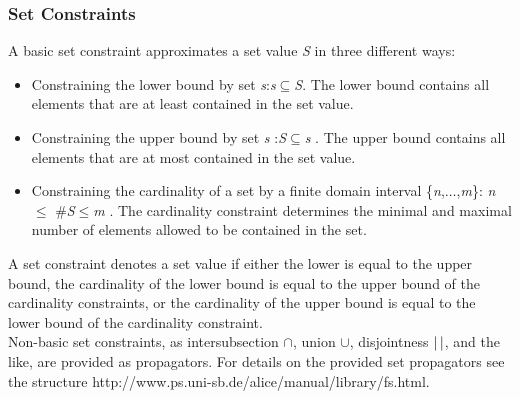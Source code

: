 \documentclass[a4paper]{scrartcl}
\begin{document}
\subsubsection{Set Constraints}
A basic set constraint approximates a set value {\it S} 
in three different ways: 
\begin{itemize}
\item
Constraining the lower bound by set {\it s}:{\it s}$\subseteq${\it S}. 
The lower bound contains all elements that are at 
least contained in the set value. 
\item
Constraining the upper bound by set {\it s} :{\it S}$\subseteq${\it s} . 
The upper bound contains all elements that 
are at most contained in the set value. 
\item
Constraining the cardinality of a set by a finite 
domain interval \{{\it n},$\ldots$,{\it m}\}: {\it n}$\le$ $\#${\it S}$\le${\it m} . 
The cardinality constraint determines the minimal 
and maximal number of elements allowed to be contained in the set. 
\end{itemize}
\par
A set constraint denotes a set value if either the lower 
is equal to the upper bound, the cardinality of the lower 
bound is equal to the upper bound of the cardinality constraints, 
or the cardinality of the upper bound is equal to the lower 
bound of the cardinality constraint.\\

Non-basic set constraints, as intersubsection $\cap$, union $\cup$, 
disjointness $|\thinspace|$, 
and the like, are provided as propagators. For details on the provided 
set propagators see the structure
\htmladdnormallink{\textcolor{blue}{FS}}
{http://www.ps.uni-sb.de/alice/manual/library/fs.html}.
\end{document}
